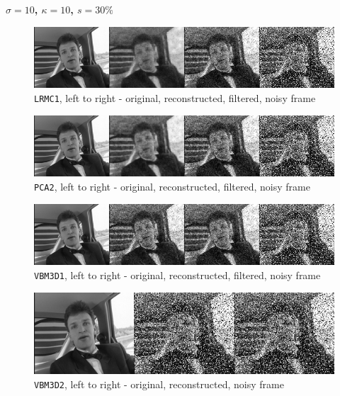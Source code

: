 \documentclass[fleqn, 11pt]{article}
\begin{document}
\textbf{$\sigma = 10$, $\kappa = 10$, $s = 30\%$}
\begin{figure}[H]
    \centering
    \includegraphics[scale=0.7]{10_10_30_LRMC1.png}
    \caption{\texttt{LRMC1}, left to right - original, reconstructed, filtered, noisy frame}
\end{figure}
\begin{figure}[H]
    \centering
    \includegraphics[scale=0.7]{10_10_30_PCA2.png}
    \caption{\texttt{PCA2}, left to right - original, reconstructed, filtered, noisy frame}
\end{figure}
\begin{figure}[H]
    \centering
    \includegraphics[scale=0.7]{10_10_30_VBM3D1.png}
    \caption{\texttt{VBM3D1}, left to right - original, reconstructed, filtered, noisy frame}
\end{figure}
\begin{figure}[H]
    \centering
    \includegraphics[scale=0.7]{10_10_30_VBM3D2.png}
    \caption{\texttt{VBM3D2}, left to right - original, reconstructed, noisy frame}
\end{figure}
\end{document}
